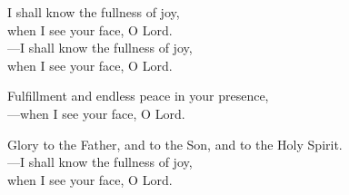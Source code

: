 \responsory

\noindent I shall know the fullness of joy,\\
when I see your face, O Lord.\\
{\color{red}---\thinspace}I shall know the fullness of joy,\\
when I see your face, O Lord.

\medskip\noindent Fulfillment and endless peace in your presence,\\
{\color{red}---\thinspace}when I see your face, O Lord.

\medskip\noindent Glory to the Father, and to the Son, and to the Holy Spirit.\\
{\color{red}---\thinspace}I shall know the fullness of joy,\\
when I see your face, O Lord.